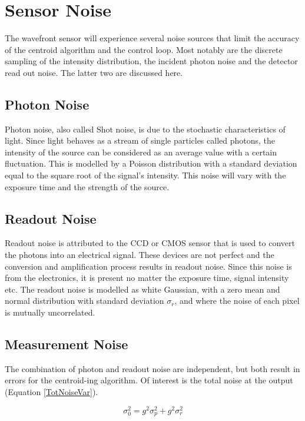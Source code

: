 \section{Sensor Noise}

The wavefront sensor will experience several noise sources that limit the accuracy of the centroid algorithm and the control loop.  Most notably are the discrete sampling of the intensity distribution, the incident photon noise and the detector read out noise.  The latter two are discussed here.  

\subsection{Photon Noise}

Photon noise, also called Shot noise, is due to the stochastic characteristics of light.  Since light behaves as a stream of single particles called photons, the intensity of the source can be considered as an average value with a certain fluctuation.  This is modelled by a Poisson distribution with a standard deviation equal to the square root of the signal's intensity. This noise will vary with the exposure time and the strength of the source.  

\subsection{Readout Noise}

Readout noise is attributed to the CCD or CMOS sensor that is used to convert the photons into an electrical signal.  These devices are not perfect and the conversion and amplification process results in readout noise.  Since this noise is from the electronics, it is present no matter the exposure time, signal intensity etc.  The readout noise is modelled as white Gaussian, with a zero mean and normal distribution with standard deviation $\sigma_r$, and where the noise of each pixel is mutually uncorrelated. 

\subsection{Measurement Noise}
The combination of photon and readout noise are independent, but both result in errors for the centroid-ing algorithm.  Of interest is the total noise at the output (Equation \ref{TotNoiseVar}).

\begin{equation}
\sigma_0^2 = g^2\sigma_p^2 + g^2\sigma_r^2
\label{TotNoiseVar}
\end{equation}

